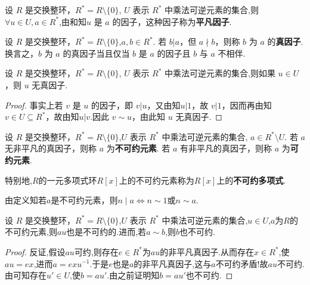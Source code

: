 \documentclass[../../main.tex]{subfiles}%
\begin{document}
\begin{definition}
设 \( R \) 是交换整环，\( R^* = R \setminus \{0\} \), \( U \) 表示 \( R^* \) 中乘法可逆元素的集合,则\( \forall u \in U, a \in R^* \),由和知\( u\) 是 \( a \) 的因子，这种因子称为\textbf{平凡因子}.
\end{definition}

\begin{definition}
设 \( R \) 是交换整环，\( R^* = R \setminus \{0\} \),\( a, b \in R^* \). 若 \( b|a \)，但 \( a \nmid b \)，则称 \( b \) 为 \( a \) 的\textbf{真因子}.换言之，\( b \) 为 \( a \) 的真因子当且仅当 \( b \) 是 \( a \) 的因子且 \( b \) 与 \( a \) 不相伴.
\end{definition}

\begin{theorem}\label{theorem:单位群中元素都无真因子}
设 \( R \) 是交换整环，\( R^* = R \setminus \{0\} \), \( U \) 表示 \( R^* \) 中乘法可逆元素的集合,则如果 \( u \in U \)，则 \( u \) 无真因子.
\end{theorem}
\begin{proof}
事实上若 \( v \) 是 \( u \) 的因子，即 \( v|u \)，又由知\( u|1 \)，故 \( v|1 \)，因而再由知\( v \in U \subseteq R^*\)，故由知$u|v$.因此 \( v \sim u \)，由此知 \( u \) 无真因子.
\end{proof}

\begin{definition}
设 \( R \) 是交换整环，\( R^* = R \setminus \{0\} \),\( U \) 表示 \( R^* \) 中乘法可逆元素的集合, \( a \in R^* \setminus U \). 若 \( a \) 无非平凡的真因子，则称 \( a \) 为\textbf{不可约元素}. 若 \( a \) 有非平凡的真因子，则称 \( a \) 为\textbf{可约元素}.

特别地,$R$的一元多项式环$R[x]$上的不可约元素称为$R[x]$上的\textbf{不可约多项式}.
\end{definition}
\begin{remark}
由定义知若$a$是不可约元素，则$n\mid a\iff n\sim 1\text{或}n\sim a$.
\end{remark}

\begin{proposition}\label{proposition:不可约元素乘单位仍不可约}
设 \( R \) 是交换整环，\( R^* = R \setminus \{0\} \),\( U \) 表示 \( R^* \) 中乘法可逆元素的集合,$u\in U$,$a$为$R$的不可约元素,则$au$也是不可约的.进而,若$a\sim b$,则$b$也不可约.
\end{proposition}
\begin{proof}
反证,假设$au$可约,则存在$e\in R^*$为$au$的非平凡真因子.从而存在$x\in R^*$,使$au=ex$,进而$a=exu^{-1}$.于是$e$也是$a$的非平凡真因子,这与$a$不可约矛盾!故$au$不可约.由可知存在$u'\in U$,使$b=au'$.由之前证明知$b=au'$也不可约.
\end{proof}
\end{document}
